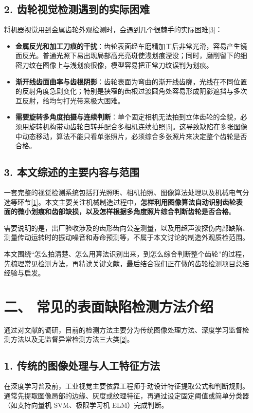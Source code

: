 \subsection*{2. 齿轮视觉检测遇到的实际困难}
将机器视觉用到金属齿轮外观检测时，会遇到几个很棘手的实际困难[\hyperlink{ref:3}{3}]：
\begin{itemize}
\item \textbf{金属反光和加工刀痕的干扰}：齿轮表面经车磨精加工后非常光滑，容易产生镜面反光。普通光照下易出现局部高光亮斑使浅划痕湮没；同时，磨削留下的细密刀纹在图像上与浅划痕很像，模型容易把正常刀纹误判为划痕。
\item \textbf{渐开线齿面曲率与齿根阴影}：齿轮表面为弯曲的渐开线齿廓，光线在不同位置的反射角度急剧变化；特别是狭窄的齿根过渡圆角处容易形成阴影遮挡与多次互反射，给均匀打光带来极大困难。
\item \textbf{需要旋转多角度拍摄与连续判断}：单个固定相机无法拍到立体齿轮的全貌，必须用旋转机构带动齿轮自转并配合多相机连续拍照[\hyperlink{ref:5}{5}]。这导致缺陷在多张图像中动态移动，算法不能只看单张照片，必须综合多张照片来决定整个齿轮是否合格。

\end{itemize}
\subsection*{3. 本文综述的主要内容与范围}
一套完整的视觉检测系统包括打光照明、相机拍照、图像算法处理以及机械电气分选等环节[\hyperlink{ref:1}{1}]。本文主要关注机械制造过程中，\textbf{怎样利用图像算法自动识别齿轮表面的微小划痕和齿部缺损，以及怎样根据多角度照片综合判断齿轮是否合格}。

需要说明的是，出厂验收涉及的齿形齿向公差测量，以及用超声波探伤内部缺陷、测量传动运转时的振动噪音和寿命预测等，不属于本文讨论的制造外观质检范围。

本文围绕“怎么拍清楚、怎么用算法识别出来，到怎么综合判断整个齿轮”的过程，先梳理常见检测方法，再精读关键文献，最后结合我们正在做的齿轮检测项目总结经验与启发。


\section*{二、 常见的表面缺陷检测方法介绍}

通过对文献的调研，目前的检测方法主要分为传统图像处理方法、深度学习监督检测方法以及无监督异常检测方法三大类[\hyperlink{ref:2}{2}]。

\subsection*{1. 传统的图像处理与人工特征方法}
在深度学习普及前，工业视觉主要依靠工程师手动设计特征提取公式和判断规则。通常先提取图像局部的边缘、灰度或纹理特征，再通过设定固定阈值或简单分类器（如支持向量机 SVM、极限学习机 ELM）完成判断。

